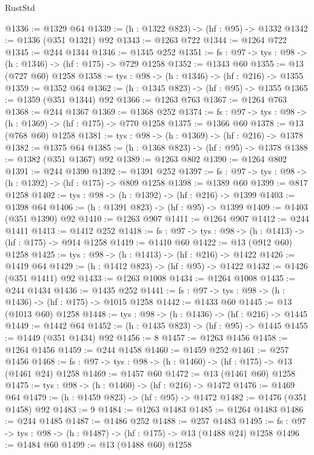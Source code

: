 \begin{lexlean}{RustStd}
\begin{coremodule}
{\begin{coremodule}
{{{{{{{{{@1336 := @1329 @64
@1339 := (h : @1322 @823) -> (hf : @95) -> @1332
@1342 := @1336 (@351 @1321) @92
@1343 := @1263 @722
@1344 := @1264 @722
@1345 := @244 @1344
@1346 := @1345 @252
@1351 := {fs : @97} -> {tys : @98} -> (h : @1346) -> (hf : @175) -> @729 @1258
@1352 := @1343 @60
@1355 := @13 (@727 @60) @1258
@1358 := {tys : @98} -> (h : @1346) -> (hf : @216) -> @1355
@1359 := @1352 @64
@1362 := (h : @1345 @823) -> (hf : @95) -> @1355
@1365 := @1359 (@351 @1344) @92
@1366 := @1263 @763
@1367 := @1264 @763
@1368 := @244 @1367
@1369 := @1368 @252
@1374 := {fs : @97} -> {tys : @98} -> (h : @1369) -> (hf : @175) -> @770 @1258
@1375 := @1366 @60
@1378 := @13 (@768 @60) @1258
@1381 := {tys : @98} -> (h : @1369) -> (hf : @216) -> @1378
@1382 := @1375 @64
@1385 := (h : @1368 @823) -> (hf : @95) -> @1378
@1388 := @1382 (@351 @1367) @92
@1389 := @1263 @802
@1390 := @1264 @802
@1391 := @244 @1390
@1392 := @1391 @252
@1397 := {fs : @97} -> {tys : @98} -> (h : @1392) -> (hf : @175) -> @809 @1258
@1398 := @1389 @60
@1399 := @817 @1258
@1402 := {tys : @98} -> (h : @1392) -> (hf : @216) -> @1399
@1403 := @1398 @64
@1406 := (h : @1391 @823) -> (hf : @95) -> @1399
@1409 := @1403 (@351 @1390) @92
@1410 := @1263 @907
@1411 := @1264 @907
@1412 := @244 @1411
@1413 := @1412 @252
@1418 := {fs : @97} -> {tys : @98} -> (h : @1413) -> (hf : @175) -> @914 @1258
@1419 := @1410 @60
@1422 := @13 (@912 @60) @1258
@1425 := {tys : @98} -> (h : @1413) -> (hf : @216) -> @1422
@1426 := @1419 @64
@1429 := (h : @1412 @823) -> (hf : @95) -> @1422
@1432 := @1426 (@351 @1411) @92
@1433 := @1263 @1008
@1434 := @1264 @1008
@1435 := @244 @1434
@1436 := @1435 @252
@1441 := {fs : @97} -> {tys : @98} -> (h : @1436) -> (hf : @175) -> @1015 @1258
@1442 := @1433 @60
@1445 := @13 (@1013 @60) @1258
@1448 := {tys : @98} -> (h : @1436) -> (hf : @216) -> @1445
@1449 := @1442 @64
@1452 := (h : @1435 @823) -> (hf : @95) -> @1445
@1455 := @1449 (@351 @1434) @92
@1456 := 8
@1457 := @1263 @1456
@1458 := @1264 @1456
@1459 := @244 @1458
@1460 := @1459 @252
@1461 := @257 @1456
@1468 := {fs : @97} -> {tys : @98} -> (h : @1460) -> (hf : @175) -> @13 (@1461 @24) @1258
@1469 := @1457 @60
@1472 := @13 (@1461 @60) @1258
@1475 := {tys : @98} -> (h : @1460) -> (hf : @216) -> @1472
@1476 := @1469 @64
@1479 := (h : @1459 @823) -> (hf : @95) -> @1472
@1482 := @1476 (@351 @1458) @92
@1483 := 9
@1484 := @1263 @1483
@1485 := @1264 @1483
@1486 := @244 @1485
@1487 := @1486 @252
@1488 := @257 @1483
@1495 := {fs : @97} -> {tys : @98} -> (h : @1487) -> (hf : @175) -> @13 (@1488 @24) @1258
@1496 := @1484 @60
@1499 := @13 (@1488 @60) @1258
}}}}}}}}}
\end{coremodule}}
\end{coremodule}
\end{lexlean}
